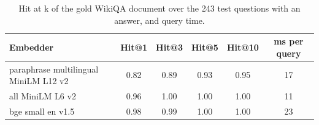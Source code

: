 \begin{table}[!tb]
\centering
\caption{Hit at k of the gold WikiQA document over the 243 test questions with an answer, and query time.}
\label{tab:retrieval}
\small
\begin{tabular}{lccccc}
\toprule
Embedder & Hit@1 & Hit@3 & Hit@5 & Hit@10 & ms per query \\
\midrule
paraphrase multilingual MiniLM L12 v2 & 0.82 & 0.89 & 0.93 & 0.95 & 17 \\
all MiniLM L6 v2 & 0.96 & 1.00 & 1.00 & 1.00 & 11 \\
bge small en v1.5 & 0.98 & 0.99 & 1.00 & 1.00 & 23 \\
\bottomrule
\end{tabular}
\end{table}
